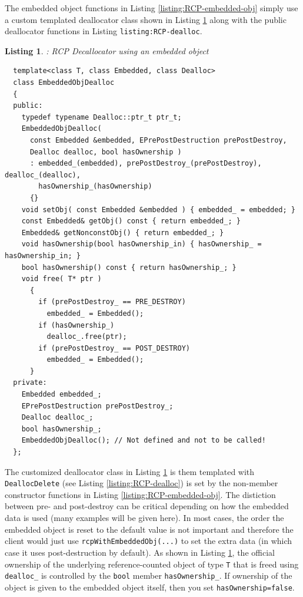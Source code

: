\documentclass[pdf,ps2pdf,11pt]{SANDreport}
\newtheorem{listing}{Listing}
\begin{document}
The embedded object functions in Listing
{}\ref{listing:RCP-embedded-obj} simply use a custom templated
deallocator class shown in Listing
{}\ref{listing:RCP-EmbeddedObjDealloc} along with the public
deallocator functions in Listing {}\texttt{listing:RCP-dealloc}.

\begin{listing}: RCP Decallocator using an embedded object \\
\label{listing:RCP-EmbeddedObjDealloc}
{\small\begin{verbatim}
  template<class T, class Embedded, class Dealloc>
  class EmbeddedObjDealloc
  {
  public:
    typedef typename Dealloc::ptr_t ptr_t;
    EmbeddedObjDealloc(
      const Embedded &embedded, EPrePostDestruction prePostDestroy,
      Dealloc dealloc, bool hasOwnership )
      : embedded_(embedded), prePostDestroy_(prePostDestroy), dealloc_(dealloc),
        hasOwnership_(hasOwnership)
      {}
    void setObj( const Embedded &embedded ) { embedded_ = embedded; }
    const Embedded& getObj() const { return embedded_; }
    Embedded& getNonconstObj() { return embedded_; }
    void hasOwnership(bool hasOwnership_in) { hasOwnership_ = hasOwnership_in; }
    bool hasOwnership() const { return hasOwnership_; }
    void free( T* ptr )
      {
        if (prePostDestroy_ == PRE_DESTROY)
          embedded_ = Embedded();
        if (hasOwnership_)
          dealloc_.free(ptr);
        if (prePostDestroy_ == POST_DESTROY)
          embedded_ = Embedded();
      }
  private:
    Embedded embedded_;
    EPrePostDestruction prePostDestroy_;
    Dealloc dealloc_;
    bool hasOwnership_;
    EmbeddedObjDealloc(); // Not defined and not to be called!
  };
\end{verbatim}}
\end{listing}

The customized deallocator class in Listing
{}\ref{listing:RCP-EmbeddedObjDealloc} is them templated with
{}\texttt{DeallocDelete} (see Listing {}\ref{listing:RCP-dealloc}) is
set by the non-member constructor functions in Listing
{}\ref{listing:RCP-embedded-obj}.  The distiction between pre- and
post-destroy can be critical depending on how the embedded data is
used (many examples will be given here).  In most cases, the order the
embedded object is reset to the default value is not important and
therefore the client would just use {}\texttt{rcpWithEmbeddedObj(...)} 
to set the extra data (in which case it uses post-destruction by
default).  As shown in Listing {}\ref{listing:RCP-EmbeddedObjDealloc},
the official ownership of the underlying reference-counted object of
type {}\texttt{T} that is freed using {}\texttt{dealloc\_} is
controlled by the {}\texttt{bool} member {}\texttt{hasOwnership\_}.
If ownership of the object is given to the embedded object itself,
then you set {}\texttt{hasOwnership=false}.
\end{document}
